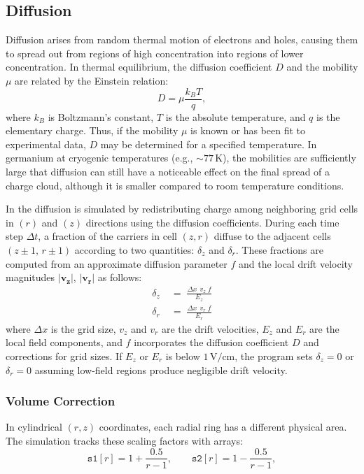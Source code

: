 \subsection{Diffusion}
Diffusion arises from random thermal motion of electrons and holes, causing them to spread out from regions of high concentration into regions of lower concentration. In thermal equilibrium, the diffusion coefficient $D$ and the mobility $\mu$
are related by the Einstein relation:
\begin{equation}
D = \mu \frac{k_B T}{q},
\end{equation}
where $k_B$ is Boltzmann's constant, $T$ is the absolute temperature, and $q$ is the elementary charge. Thus, if the mobility $\mu$ is known or has been fit to experimental data, $D$ may be determined for a specified temperature. In germanium at cryogenic temperatures (e.g., $\sim 77$\,K), the mobilities are
sufficiently large that diffusion can still have a noticeable effect on the final spread of a charge cloud, although it is smaller compared to room temperature conditions.


In {\ehd} the diffusion is simulated by redistributing charge among neighboring grid cells in $(r)$ and $(z)$ directions using the diffusion coefficients. During each time step $\Delta t$, a fraction of the carriers in cell $(z,r)$ diffuse to the adjacent cells $(z\pm1,\,r\pm1)$ according to two quantities: $\delta_z$ and $\delta_r$. These fractions are computed from an approximate diffusion parameter $f$ and the local drift velocity magnitudes $\lvert \mathbf{v_z} \rvert$, $\lvert \mathbf{v_r} \rvert$ as follows:
\begin{align}
   \delta_z &\;=\; \frac{\Delta x \;\,v_z \;f}{E_z}\label{eq:deltaez}\\
   \delta_r &\;=\; \frac{\Delta x \;\,v_r \;f}{E_r} \label{eq:deltaer}
\end{align}
where $\Delta x$ is the grid size, $v_{z}$ and $v_{r}$ are the drift velocities, $E_{z}$ and $E_{r}$ are the local field components, and $f$ incorporates the diffusion coefficient $D$ and corrections for grid sizes. If $E_z$ or $E_r$ is below $1\,\mathrm{V/cm}$, the program sets $\delta_z = 0$ or $\delta_r=0$ assuming low-field regions produce negligible drift velocity.

\subsubsection*{Volume Correction}

In cylindrical $(r,z)$ coordinates, each radial ring has a different physical area. The simulation tracks these scaling factors with arrays:
\[
\texttt{s1}[r] = 1 + \frac{0.5}{r-1}, 
\qquad
\texttt{s2}[r] = 1 - \frac{0.5}{r-1},
\] 

